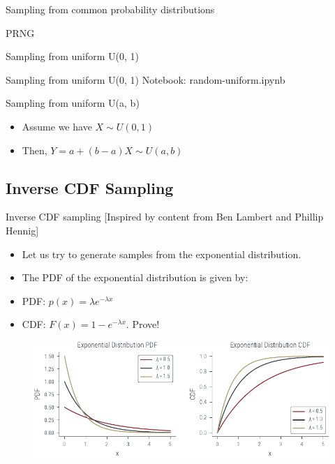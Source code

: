 \documentclass{beamer}
\begin{document}
\begin{section}{Sampling from common probability distributions}
\begin{subsection}{PRNG}
\begin{frame}{Sampling from uniform U(0, 1)}
\end{frame}

\begin{frame}{Sampling from uniform U(0, 1)}
Notebook: random-uniform.ipynb
    
\end{frame}

\begin{frame}{Sampling from uniform U(a, b)}
    \begin{itemize}
        \item Assume we have $X \sim U(0, 1)$
        \item \pause Then, $Y = a + (b - a) X \sim U(a, b)$
    \end{itemize}
    
\end{frame}

\end{subsection}

\subsection{Inverse CDF Sampling}
\begin{frame}{Inverse CDF sampling}
    [Inspired by content from Ben Lambert and Phillip Hennig]
    \begin{itemize}
        \item Let us try to generate samples from the exponential distribution. 
        \item \pause The PDF of the exponential distribution is given by:
        \item \pause PDF: $p(x) = \lambda e^{-\lambda x}$
        \item \pause CDF: $F(x) = 1 - e^{-\lambda x}$. Prove!
        
    \end{itemize}

    \begin{figure}
\includegraphics[width=\columnwidth]{../figures/sampling/exp-cdf.pdf}
    \end{figure}
    

\end{frame}
\end{section}
\end{document}
